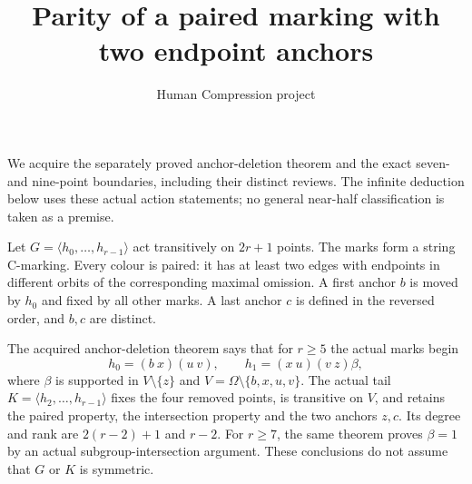 \documentclass[11pt,a4paper]{article}
\title{Parity of a paired marking with two endpoint anchors}
\author{Human Compression project}\date{}
\newcommand{\gen}[1]{\langle#1\rangle}
\begin{document}
\maketitle
We acquire the separately proved anchor-deletion theorem and the exact
seven- and nine-point boundaries, including their distinct reviews.
The infinite deduction below uses these actual action statements;
no general near-half classification is taken as a premise.

Let $G=\gen{h_0,\ldots,h_{r-1}}$ act transitively on $2r+1$ points.
The marks form a string C-marking. Every colour is paired: it has
at least two edges with endpoints in different orbits of the
corresponding maximal omission. A first anchor $b$ is moved by
$h_0$ and fixed by all other marks. A last anchor $c$ is defined
in the reversed order, and $b,c$ are distinct.

The acquired anchor-deletion theorem says that for $r\ge5$ the
actual marks begin
\[
 h_0=(b\ x)(u\ v),\qquad h_1=(x\ u)(v\ z)\beta,       \tag{1}
\]
where $\beta$ is supported in $V\setminus\{z\}$ and
$V=\Omega\setminus\{b,x,u,v\}$. The actual tail
$K=\gen{h_2,\ldots,h_{r-1}}$ fixes the four removed points,
is transitive on $V$, and retains the paired property, the
intersection property and the two anchors $z,c$. Its degree and
rank are $2(r-2)+1$ and $r-2$. For $r\ge7$, the same theorem
proves $\beta=1$ by an actual subgroup-intersection argument.
These conclusions do not assume that $G$ or $K$ is symmetric.
\end{document}
